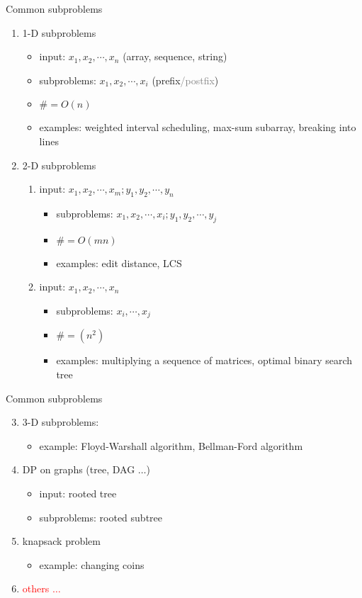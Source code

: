 \begin{frame}{Common subproblems}
  \begin{enumerate}
    \item 1-D subproblems 
      \begin{itemize}
	\item input: $x_{1}, x_{2}, \cdots, x_{n}$ (array, sequence, string)
	\item subproblems: $x_{1}, x_{2}, \cdots, x_{i}$ (prefix\textcolor{gray}{/postfix})
	\item $\# = O(n)$
	\item examples: weighted interval scheduling, max-sum subarray, breaking into lines
      \end{itemize}
    \item 2-D subproblems
      \begin{enumerate}
	\item input: $x_{1}, x_{2}, \cdots, x_{m}; y_{1}, y_{2}, \cdots, y_{n}$
	\begin{itemize}
	  \item subproblems: $x_{1}, x_{2}, \cdots, x_{i}; y_{1}, y_{2}, \cdots, y_{j}$
	  \item $\# = O(mn)$
	  \item examples: edit distance, LCS
	\end{itemize}
	\item input: $x_{1}, x_{2}, \cdots, x_{n}$
	\begin{itemize}
	  \item subproblems: $x_{i}, \cdots, x_{j}$
	  \item $\# = (n^{2})$
	  \item examples: multiplying a sequence of matrices, optimal binary search tree
	\end{itemize}
      \end{enumerate}
  \end{enumerate}
\end{frame}
\begin{frame}{Common subproblems}
  \begin{enumerate}
    \setcounter{enumi}{2}
    \item 3-D subproblems:
      \begin{itemize}
	\item example: Floyd-Warshall algorithm, Bellman-Ford algorithm
      \end{itemize}
    \item DP on graphs (tree, DAG $\ldots$)
      \begin{itemize}
	\item input: rooted tree
	\item subproblems: rooted subtree
      \end{itemize}
    \item knapsack problem
      \begin{itemize}
	\item example: changing coins
      \end{itemize}
    \item \textcolor{red}{others $\ldots$}
  \end{enumerate}
\end{frame}

